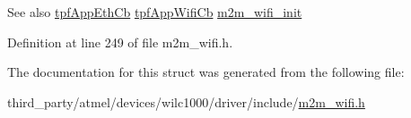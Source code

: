 \begin{DoxySeeAlso}{See also}
\hyperlink{group__WlanEnums_ga9dda38bbac67906396ad1b1e0419502d}{tpf\+App\+Eth\+Cb} \hyperlink{group__WlanEnums_gac5302f32839285fe8375c159087aa8a1}{tpf\+App\+Wifi\+Cb} \hyperlink{group__WifiInitFn_ga73c734812e844d96d860c4e93e9daf35}{m2m\+\_\+wifi\+\_\+init} 
\end{DoxySeeAlso}


Definition at line 249 of file m2m\+\_\+wifi.\+h.



The documentation for this struct was generated from the following file\+:\begin{DoxyCompactItemize}
\item 
third\+\_\+party/atmel/devices/wilc1000/driver/include/\hyperlink{m2m__wifi_8h}{m2m\+\_\+wifi.\+h}\end{DoxyCompactItemize}
